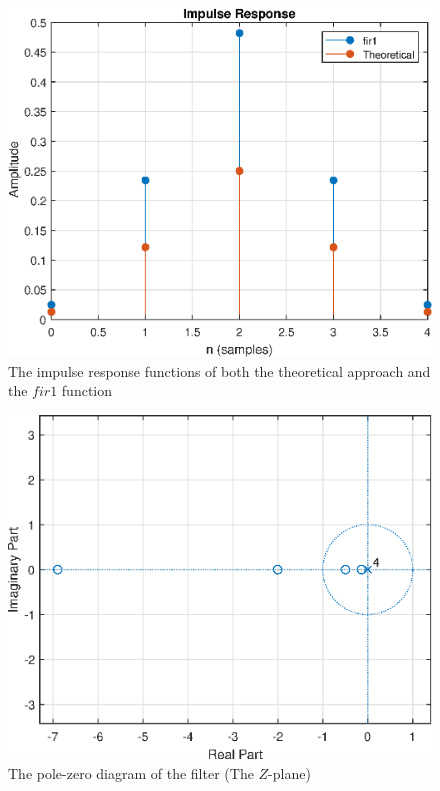\documentclass[12pt]{IEEEtran}
\begin{document}
\begin{figure}
   \includegraphics[scale=0.6]{impl.eps}
   \caption{The impulse response functions of both the theoretical approach and the $fir1$ function}
\end{figure}
\begin{figure}
   \includegraphics[scale=0.6]{zplane.eps}
   \caption{The pole-zero diagram of the filter (The $Z$-plane)}
\end{figure}  
\end{document}
